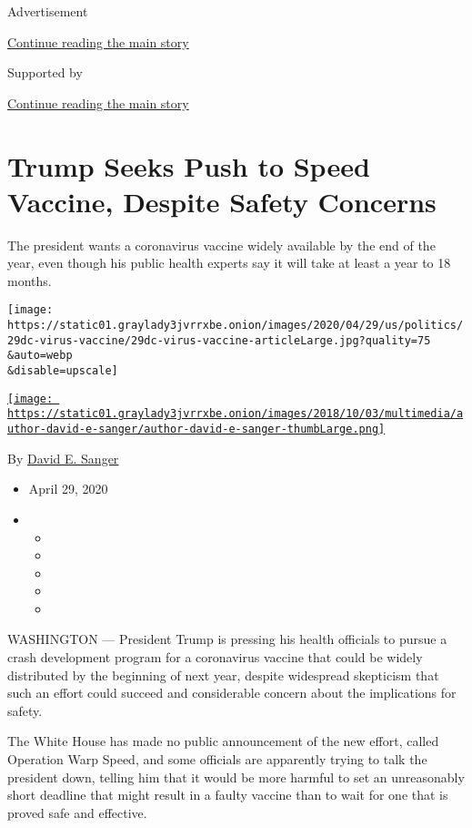Advertisement

\protect\hyperlink{after-top}{Continue reading the main story}

Supported by

\protect\hyperlink{after-sponsor}{Continue reading the main story}

\hypertarget{trump-seeks-push-to-speed-vaccine-despite-safety-concerns}{%
\section{Trump Seeks Push to Speed Vaccine, Despite Safety
Concerns}\label{trump-seeks-push-to-speed-vaccine-despite-safety-concerns}}

The president wants a coronavirus vaccine widely available by the end of
the year, even though his public health experts say it will take at
least a year to 18 months.

\texttt{[image: https://static01.graylady3jvrrxbe.onion/images/2020/04/29/us/politics/29dc-virus-vaccine/29dc-virus-vaccine-articleLarge.jpg?quality=75\\\&auto=webp\\\&disable=upscale]}

\href{https://www.nytimes3xbfgragh.onion/by/david-e-sanger}{\texttt{[image: https://static01.graylady3jvrrxbe.onion/images/2018/10/03/multimedia/author-david-e-sanger/author-david-e-sanger-thumbLarge.png]}}

By \href{https://www.nytimes3xbfgragh.onion/by/david-e-sanger}{David E.
Sanger}

\begin{itemize}
\item
  April 29, 2020
\item
  \begin{itemize}
  \item
  \item
  \item
  \item
  \item
  \end{itemize}
\end{itemize}

WASHINGTON --- President Trump is pressing his health officials to
pursue a crash development program for a coronavirus vaccine that could
be widely distributed by the beginning of next year, despite widespread
skepticism that such an effort could succeed and considerable concern
about the implications for safety.

The White House has made no public announcement of the new effort,
called Operation Warp Speed, and some officials are apparently trying to
talk the president down, telling him that it would be more harmful to
set an unreasonably short deadline that might result in a faulty vaccine
than to wait for one that is proved safe and effective.

